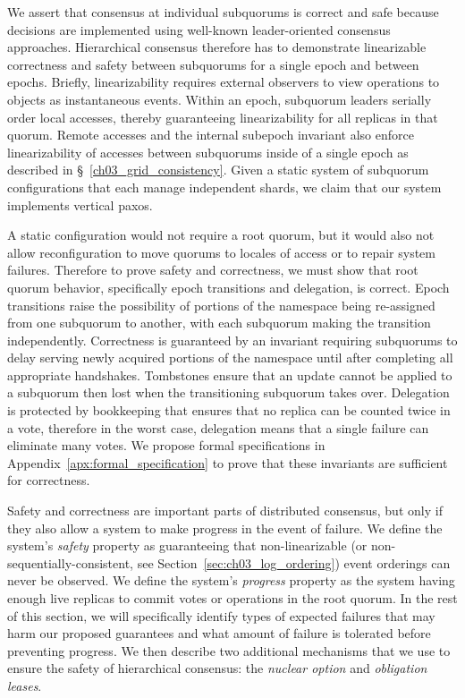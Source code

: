 We assert that consensus at individual subquorums is correct and safe because decisions are implemented using well-known leader-oriented consensus approaches.
Hierarchical consensus therefore has to demonstrate linearizable correctness and safety between subquorums for a single epoch and between epochs.
Briefly, linearizability requires external observers to view operations to objects as instantaneous events.
Within an epoch, subquorum leaders serially order local accesses, thereby guaranteeing linearizability for all replicas in that quorum.
Remote accesses and the internal subepoch invariant also enforce linearizability of accesses between subquorums inside of a single epoch as described in \S~\ref{ch03_grid_consistency}.
Given a static system of subquorum configurations that each manage independent shards, we claim that our system implements vertical paxos.

A static configuration would not require a root quorum, but it would also not allow reconfiguration to move quorums to locales of access or to repair system failures.
Therefore to prove safety and correctness, we must show that root quorum behavior, specifically epoch transitions and delegation, is correct.
Epoch transitions raise the possibility of portions of the namespace being re-assigned from one subquorum to another, with each subquorum making the transition independently.
Correctness is guaranteed by an invariant requiring subquorums to delay serving newly acquired portions of the namespace until after completing all appropriate handshakes.
Tombstones ensure that an update cannot be applied to a subquorum then lost when the transitioning subquorum takes over.
Delegation is protected by bookkeeping that ensures that no replica can be counted twice in a vote, therefore in the worst case, delegation means that a single failure can eliminate many votes.
We propose formal specifications in Appendix~\ref{apx:formal_specification} to prove that these invariants are sufficient for correctness.

Safety and correctness are important parts of distributed consensus, but only if they also allow a system to make progress in the event of failure.
We define the system's \emph{safety} property as guaranteeing that non-linearizable (or non-sequentially-consistent, see Section~\ref{sec:ch03_log_ordering}) event orderings can never be observed.
We define the system's \emph{progress} property as the system having enough live replicas to commit votes or operations in the root quorum.
In the rest of this section, we will specifically identify types of expected failures that may harm our proposed guarantees and what amount of failure is tolerated before preventing progress.
We then describe two additional mechanisms that we use to ensure the safety of hierarchical consensus: the \emph{nuclear option} and \emph{obligation leases}.

